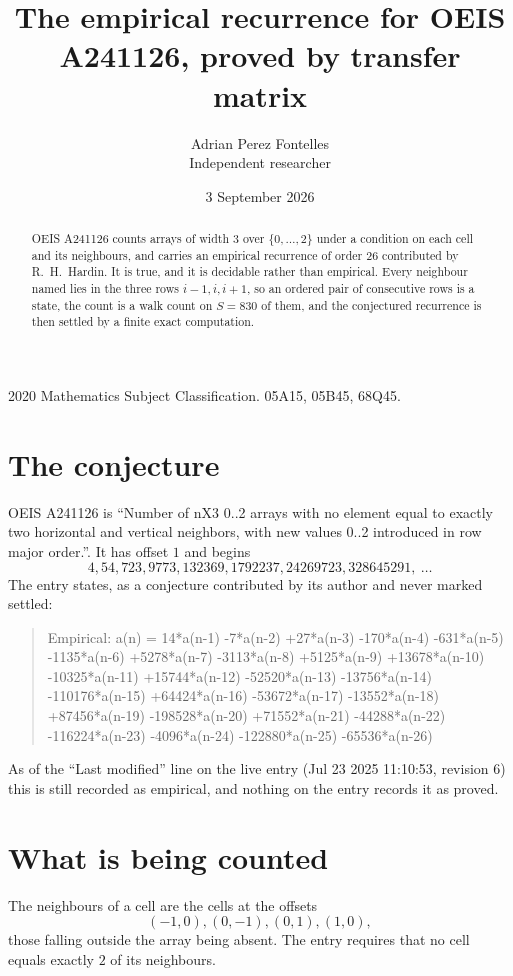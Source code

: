 \documentclass[11pt,a4paper]{article}
\title{The empirical recurrence for OEIS A241126, proved by transfer matrix}
\author{Adrian Perez Fontelles\\ \small Independent researcher}
\date{3 September 2026}
\theoremstyle{plain}
\theoremstyle{definition}
\begin{document}
\maketitle

\begin{abstract}
OEIS A241126 counts arrays of width $3$ over $\{0,\dots,2\}$ under a condition on each cell
and its neighbours, and carries an empirical recurrence of order $26$ contributed by
R.~H.~Hardin. It is true, and it is decidable rather than empirical. Every neighbour named lies
in the three rows $i-1,i,i+1$, so an ordered pair of consecutive rows is a state, the count is
a walk count on $S=830$ of them, and the conjectured recurrence is then settled by a finite
exact computation.
\end{abstract}

\noindent\small 2020 Mathematics Subject Classification. 05A15, 05B45, 68Q45.\normalsize

\section{The conjecture}

OEIS A241126 is ``Number of nX3 0..2 arrays with no element equal to exactly two horizontal and vertical neighbors, with new values 0..2 introduced in row major order.''. It has offset $1$ and begins
\[
4, 54, 723, 9773, 132369, 1792237, 24269723, 328645291,\ \dots
\]
The entry states, as a conjecture contributed by its author and never marked settled:
\begin{quote}
Empirical: a(n) = 14*a(n-1) -7*a(n-2) +27*a(n-3) -170*a(n-4) -631*a(n-5) -1135*a(n-6) +5278*a(n-7) -3113*a(n-8) +5125*a(n-9) +13678*a(n-10) -10325*a(n-11) +15744*a(n-12) -52520*a(n-13) -13756*a(n-14) -110176*a(n-15) +64424*a(n-16) -53672*a(n-17) -13552*a(n-18) +87456*a(n-19) -198528*a(n-20) +71552*a(n-21) -44288*a(n-22) -116224*a(n-23) -4096*a(n-24) -122880*a(n-25) -65536*a(n-26)
\end{quote}
As of the ``Last modified'' line on the live entry (Jul 23 2025 11:10:53, revision 6) this is still
recorded as empirical, and nothing on the entry records it as proved.

\section{What is being counted}

The neighbours of a cell are the cells at the offsets
\[
(-1,0), (0,-1), (0,1), (1,0),
\]
those falling outside the array being absent. The entry requires that no cell equals exactly $2$ of its neighbours.
\end{document}
